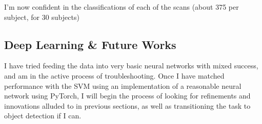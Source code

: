 \documentclass[10pt,twocolumn,letterpaper]{article}
\begin{document}
I'm now confident in the classifications of each of the scans (about 375 per subject, for 30 subjects)

\subsection{Deep Learning \& Future Works}\label{subsec:deep-learning}
I have tried feeding the data into very basic neural networks with mixed success, and am in the active process of
troubleshooting.
Once I have matched performance with the SVM using an implementation of a reasonable neural network using PyTorch, I
will begin the process of looking for refinements and innovations alluded to in previous sections, as well as
transitioning the task to object detection if I can.



{\small


}
\end{document}
